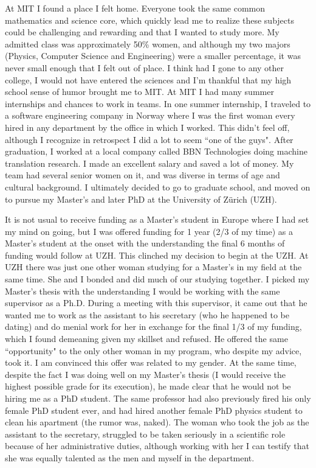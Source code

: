 \documentclass[utf8]{frontiersSCNS} %
\begin{document}
At MIT I found a place I felt home. Everyone took the same common mathematics and science core, which quickly lead me to realize these subjects could be challenging and rewarding and that I wanted to study more.  My admitted class was approximately 50\% women, and although my two majors (Physics, Computer Science and Engineering) were a smaller percentage, it was never small enough that I felt out of place. I think had I gone to any other college, I would not have entered the sciences and I'm thankful that my high school sense of humor brought me to MIT. At MIT I had many summer internships and chances to work in teams. In one summer internship, I traveled to a software engineering company in Norway where I was the first woman every hired in any department by the office in which I worked. This didn't feel off, although I recognize in retrospect I did a lot to seem ``one of the guys". After graduation, I worked at a local company called BBN Technologies doing machine translation research. I made an excellent salary and saved a lot of money. My team had several senior women on it, and was diverse in terms of age and cultural background. I ultimately decided to go to graduate school, and moved on to pursue my Master's and later PhD at the University of Z\"urich (UZH).

It is not usual to receive funding as a Master's student in Europe where I had set my mind on going, but I was offered funding for 1 year (2/3 of my time) as a Master's student at the onset with the understanding the final 6 months of funding would follow at UZH. This clinched my decision to begin at the UZH. At UZH there was just one other woman studying for a Master's in my field at the same time. She and I bonded and did much of our studying together. I picked my Master's thesis with the understanding I would be working with the same supervisor as a Ph.D. During a meeting with this supervisor, it came out that he wanted me to work as the assistant to his secretary (who he happened to be dating) and do menial work for her in exchange for the final 1/3 of my funding, which I found demeaning given my skillset and refused. He offered the same ``opportunity" to the only other woman in my program, who despite my advice, took it. I am convinced this offer was related to my gender. At the same time, despite the fact I was doing well on my Master's thesis (I would receive the highest possible grade for its execution), he made clear that he would not be hiring me as a PhD student. The same professor had also previously fired his only female PhD student ever, and had hired another female PhD physics student to clean his apartment (the rumor was, naked). The woman who took the job as the assistant to the secretary, struggled to be taken seriously in a scientific role because of her administrative duties, although working with her I can testify that she was equally talented as the men and myself in the department.
\end{document}
